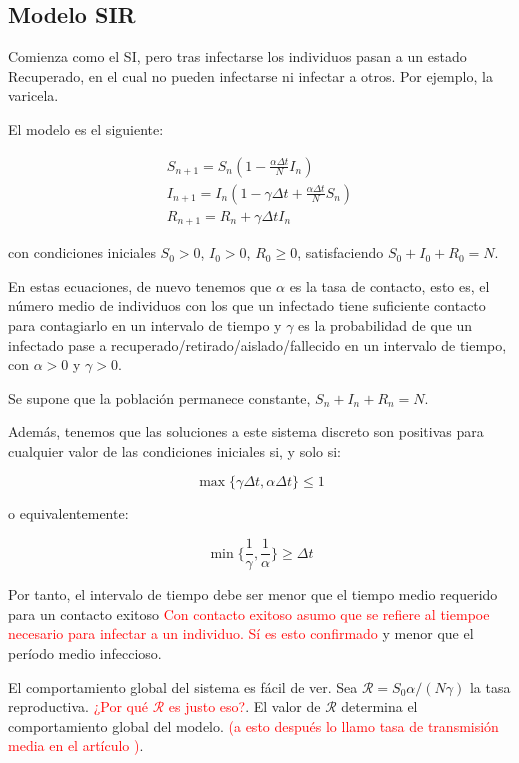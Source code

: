  

\subsection{Modelo SIR}
Comienza como el SI, pero tras infectarse los individuos pasan a un estado Recuperado, en el cual no pueden infectarse ni infectar a otros.
Por ejemplo, la varicela. 

El modelo es el siguiente:

\begin{equation}
\label{eqn: SIR_modelo}
\begin{aligned}
S_{n+1} = S_n \left(1-\frac{\alpha\Delta t}{N} I_n \right) \\
I_{n+1} = I_n \left( 1-\gamma \Delta t + \frac{\alpha\Delta t}{N} S_n \right) \\
R_{n+1} = R_n + \gamma \Delta t I_n
\end{aligned}
\end{equation}

con condiciones iniciales $S_0>0$, $I_0>0$, $R_0\geq 0$, satisfaciendo $S_0+I_0+R_0=N$.

En estas ecuaciones, de nuevo tenemos que $\alpha$ es la tasa de contacto, esto es, el número medio de individuos con los que un infectado tiene suficiente contacto para contagiarlo en un intervalo de tiempo y $\gamma$ es la probabilidad de que un infectado pase a recuperado/retirado/aislado/fallecido en un intervalo de tiempo, con $\alpha >0$ y $\gamma >0$.

Se supone que la población permanece constante, $S_n+I_n+R_n=N$.

Además, tenemos que las soluciones a este sistema discreto son positivas para cualquier valor de las condiciones iniciales si, y solo si:

$$\max{\big\{\gamma\Delta t, \alpha\Delta t\big\} } \leq 1$$

o equivalentemente:

$$\min{\bigg\{ \frac{1}{\gamma}, \frac{1}{\alpha} \bigg\} } \geq \Delta t$$

Por tanto, el intervalo de tiempo debe ser menor que el tiempo medio requerido para un contacto exitoso \textcolor{red}{Con contacto exitoso asumo que se refiere al tiempoe necesario para infectar a un individuo. Sí es esto confirmado} y menor que el período medio infeccioso.

El comportamiento global del sistema es fácil de ver. Sea $\mathcal{R}=S_0 \alpha/(N\gamma )$ la tasa reproductiva. \textcolor{red}{¿Por qué $\mathcal{R}$ es justo eso?}. El valor de $\mathcal{R}$ determina el comportamiento global del modelo. \textcolor{red}{(a esto después lo llamo tasa de transmisión media en el artículo \cite{demongeotSIEpidemicModel})}. 

